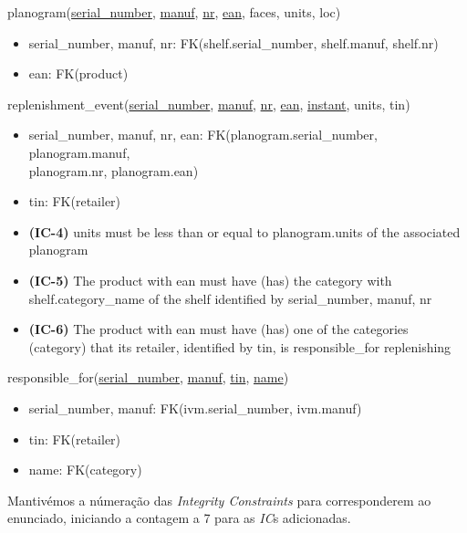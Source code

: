 \documentclass[12pt,a4paper]{article}
\begin{document}
  \vspace*{10pt}

  \noindent
  planogram(\underline{serial\_number}, \underline{manuf}, \underline{nr}, \underline{ean}, faces, units, loc)
  \begin{itemize}[nosep]
    \item serial\_number, manuf, nr: FK(shelf.serial\_number, shelf.manuf, shelf.nr)
    \item ean: FK(product)
  \end{itemize}

  \vspace*{10pt}

  \noindent
  replenishment\_event(\underline{serial\_number}, \underline{manuf}, \underline{nr}, \underline{ean}, \underline{instant}, units, tin)
  \begin{itemize}[nosep]
    \item serial\_number, manuf, nr, ean: FK(planogram.serial\_number, planogram.manuf,\\ planogram.nr, planogram.ean)
    \item tin: FK(retailer)
    \item \textsf{\textbf{(IC-4)}} units \textsf{must be less than or equal to} planogram.units \textsf{of the associated} planogram
    \item \textsf{\textbf{(IC-5)} The product with} ean \textsf{must have} (has) \textsf{the} category \textsf{with} shelf.category\_name \textsf{of the} shelf \textsf{identified by} serial\_number, manuf, nr
    \item \textsf{\textbf{(IC-6)} The product with} ean \textsf{must have} (has) \textsf{one of the categories} (category) \textsf{that its} retailer\textsf{, identified by} tin\textsf{, is} responsible\_for \textsf{replenishing}
    \end{itemize}

  \vspace*{10pt}

  \noindent
  responsible\_for(\underline{serial\_number}, \underline{manuf}, \underline{tin}, \underline{name})
  \begin{itemize}[nosep]
    \item serial\_number, manuf: FK(ivm.serial\_number, ivm.manuf)
    \item tin: FK(retailer)
    \item name: FK(category)
  \end{itemize}

  \sffamily
  \vspace*{10pt}
  \noindent
  Mantivémos a númeração das \textit{Integrity Constraints} para corresponderem ao enunciado, iniciando a contagem a 7 para as \textit{IC}s adicionadas.
\end{document}
